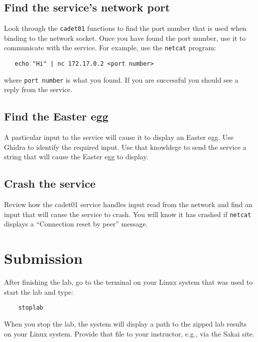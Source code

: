 \subsection{Find the service's network port}
Look through the {\tt cadet01} functions to find the port number that is used when binding to the network socket.
Once you have found the port number, use it to communicate with the service.  For example, use the {\tt netcat} program:
\begin{verbatim}
   echo "Hi" | nc 172.17.0.2 <port number>
\end{verbatim}
\noindent where {\tt port number} is what you found.  If you are successful you should see a reply from the service.

\subsection{Find the Easter egg}
A particular input to the service will cause it to display an Easter egg.  Use Ghidra to identify the required input.
Use that knowldege to send the service a string that will cause the Easter egg to display.

\subsection{Crash the service}
Review how the {cadet01} service handles input read from the network and find an input that will cause the service to crash.
You will know it has crashed if {\tt netcat} displays a ``Connection reset by peer'' message.

\section{Submission}
After finishing the lab, go to the terminal on your Linux system that was used to start the lab and type:
\begin{verbatim}
    stoplab 
\end{verbatim}
When you stop the lab, the system will display a path to the zipped lab results on your Linux system.  Provide that file to 
your instructor, e.g., via the Sakai site.

\copyrightnotice


